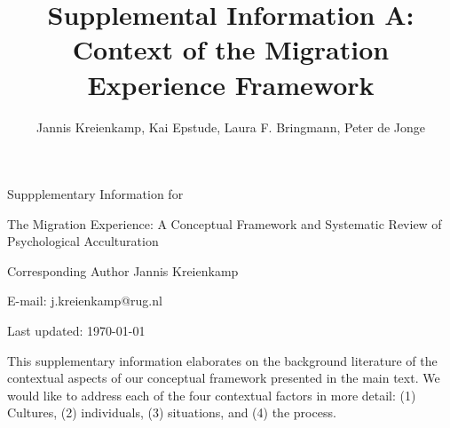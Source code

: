\documentclass[man, 12pt, a4paper]{apa7}
\title{Supplemental Information A: Context of the Migration Experience Framework}
\author{Jannis Kreienkamp, Kai Epstude, Laura F. Bringmann, Peter de Jonge}
\begin{document}
\begin{titlepage}
	{\noindent\Large Suppplementary Information for \par}
	\vspace{0.5cm}
	{\noindent\Large The Migration Experience: A Conceptual Framework and Systematic Review of Psychological Acculturation\par}
	\vspace{1.5cm}
	{\noindent\LARGE\bfseries \thetitle \par}
	\vspace{2cm}
	{\noindent\Large\itshape \theauthor \par}
	\vfill
	\noindent Corresponding Author Jannis Kreienkamp\par
	\noindent E-mail: j.kreienkamp@rug.nl\par
	\vfill

	{\noindent Last updated: \today\par}
\end{titlepage}

\begin{center}
   \textbf{\thetitle} 
\end{center}

This supplementary information elaborates on the background literature of the contextual aspects of our conceptual framework presented in the main text. We would like to address each of the four contextual factors in more detail: (1) Cultures, (2) individuals, (3) situations, and (4) the process.
\end{document}
